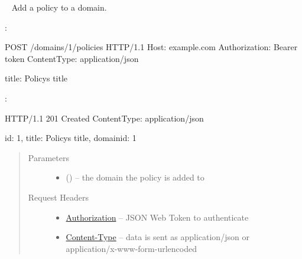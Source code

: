 \documentclass[letterpaper,10pt,english]{sphinxmanual}
\begin{document}
\begin{fulllineitems}
\label{\detokenize{resources/domain:post--domains-(domain_id)-policies}}~
Add a policy to a domain.

:

\begin{sphinxVerbatim}[commandchars=\\\{\}]
POST /domains/1/policies HTTP/1.1
Host: example.com
Authorization: Bearer \PYGZlt{}token\PYGZgt{}
Content\PYGZhy{}Type: application/json

\PYGZob{}
    \PYGZsq{}title\PYGZsq{}: \PYGZsq{}Policy\PYGZsq{}s title\PYGZsq{}
\PYGZcb{}
\end{sphinxVerbatim}

:

\begin{sphinxVerbatim}[commandchars=\\\{\}]
HTTP/1.1 201 Created
Content\PYGZhy{}Type: application/json

\PYGZob{}
    \PYGZsq{}id\PYGZsq{}: 1,
    \PYGZsq{}title\PYGZsq{}: \PYGZsq{}Policy\PYGZsq{}s title\PYGZsq{},
    \PYGZsq{}domain\PYGZus{}id\PYGZsq{}: 1
\PYGZcb{}
\end{sphinxVerbatim}
\begin{quote}\begin{description}
\item[{Parameters}] \leavevmode\begin{itemize}
\item {} 
 () -- the domain the policy is added to

\end{itemize}

\item[{Request Headers}] \leavevmode\begin{itemize}
\item {} 
\href{http://tools.ietf.org/html/rfc7235\#section-4.2}{Authorization} -- JSON Web Token to authenticate

\item {} 
\href{http://tools.ietf.org/html/rfc7231\#section-3.1.1.5}{Content-Type} -- data is sent as application/json or
application/x-www-form-urlencoded

\end{itemize}


\end{description}
\end{quote}
\end{fulllineitems}
\end{document}
